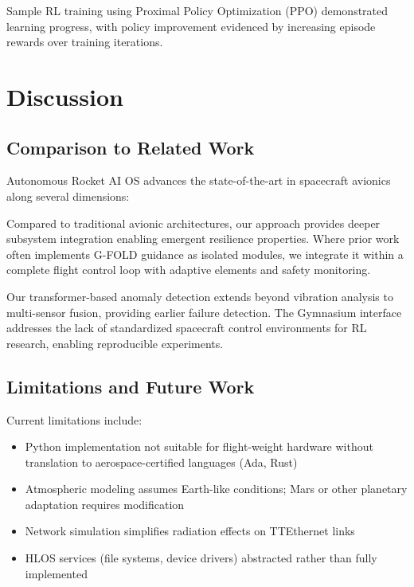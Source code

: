 \documentclass[10pt, conference, compsocconf]{IEEEtran}
\begin{document}
Sample RL training using Proximal Policy Optimization (PPO) demonstrated learning progress, with policy improvement evidenced by increasing episode rewards over training iterations.

\section{Discussion}
\label{sec:discussion}

\subsection{Comparison to Related Work}

Autonomous Rocket AI OS advances the state-of-the-art in spacecraft avionics along several dimensions:

Compared to traditional avionic architectures\cite{cziklovszki2020avionics}, our approach provides deeper subsystem integration enabling emergent resilience properties. Where prior work often implements G-FOLD guidance\cite{acikmese2007convex} as isolated modules, we integrate it within a complete flight control loop with adaptive elements and safety monitoring.

Our transformer-based anomaly detection extends beyond vibration analysis\cite{lee2019deep} to multi-sensor fusion, providing earlier failure detection. The Gymnasium interface addresses the lack of standardized spacecraft control environments\cite{kim2021deep} for RL research, enabling reproducible experiments.

\subsection{Limitations and Future Work}

Current limitations include:
\begin{itemize}
\item Python implementation not suitable for flight-weight hardware without translation to aerospace-certified languages (Ada, Rust)
\item Atmospheric modeling assumes Earth-like conditions; Mars or other planetary adaptation requires modification
\item Network simulation simplifies radiation effects on TTEthernet links\cite{tttechethernet}
\item HLOS services (file systems, device drivers) abstracted rather than fully implemented
\end{itemize}
\end{document}
